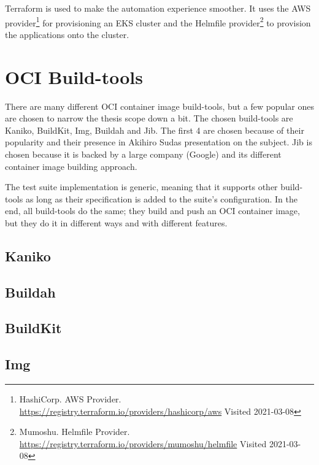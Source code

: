 Terraform is used to make the automation experience smoother. It uses the AWS provider\footnote{HashiCorp. AWS Provider. \url{https://registry.terraform.io/providers/hashicorp/aws} Visited 2021-03-08} for provisioning an EKS cluster and the Helmfile provider\footnote{Mumoshu. Helmfile Provider. \url{https://registry.terraform.io/providers/mumoshu/helmfile} Visited 2021-03-08} to provision the applications onto the cluster. 


\section{OCI Build-tools}
There are many different OCI container image build-tools, but a few popular ones are chosen to narrow the thesis scope down a bit. The chosen build-tools are Kaniko\cite{github_kaniko}, BuildKit\cite{github_buildkit}, Img\cite{github_img}, Buildah\cite{github_buildah} and Jib\cite{github_jib}. The first 4 are chosen because of their popularity and their presence in Akihiro Sudas\cite{oci_slides} presentation on the subject. Jib is chosen because it is backed by a large company (Google) and its different container image building approach.

The test suite implementation is generic, meaning that it supports other build-tools as long as their specification is added to the suite's configuration. In the end, all build-tools do the same; they build and push an OCI container image, but they do it in different ways and with different features. 

\subsection{Kaniko}
\subsection{Buildah}
\subsection{BuildKit}
\subsection{Img}
